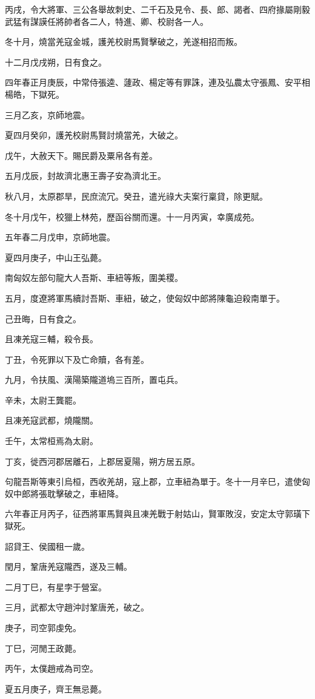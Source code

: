 \begin{pinyinscope}
丙戌，令大將軍、三公各舉故刺史、二千石及見令、長、郎、謁者、四府掾屬剛毅武猛有謀謨任將帥者各二人，特進、卿、校尉各一人。

冬十月，燒當羌寇金城，護羌校尉馬賢擊破之，羌遂相招而叛。

十二月戊戌朔，日有食之。

四年春正月庚辰，中常侍張逵、蘧政、楊定等有罪誅，連及弘農太守張鳳、安平相楊皓，下獄死。

三月乙亥，京師地震。

夏四月癸卯，護羌校尉馬賢討燒當羌，大破之。

戊午，大赦天下。賜民爵及粟帛各有差。

五月戊辰，封故濟北惠王壽子安為濟北王。

秋八月，太原郡旱，民庶流冗。癸丑，遣光祿大夫案行稟貸，除更賦。

冬十月戊午，校獵上林苑，歷函谷關而還。十一月丙寅，幸廣成苑。

五年春二月戊申，京師地震。

夏四月庚子，中山王弘薨。

南匈奴左部句龍大人吾斯、車紐等叛，圍美稷。

五月，度遼將軍馬續討吾斯、車紐，破之，使匈奴中郎將陳龜迫殺南單于。

己丑晦，日有食之。

且凍羌寇三輔，殺令長。

丁丑，令死罪以下及亡命贖，各有差。

九月，令扶風、漢陽築隴道塢三百所，置屯兵。

辛未，太尉王龔罷。

且凍羌寇武都，燒隴關。

壬午，太常桓焉為太尉。

丁亥，徙西河郡居離石，上郡居夏陽，朔方居五原。

句龍吾斯等東引烏桓，西收羌胡，寇上郡，立車紐為單于。冬十一月辛巳，遣使匈奴中郎將張耽擊破之，車紐降。

六年春正月丙子，征西將軍馬賢與且凍羌戰于射姑山，賢軍敗沒，安定太守郭璜下獄死。

詔貸王、侯國租一歲。

閏月，鞏唐羌寇隴西，遂及三輔。

二月丁巳，有星孛于營室。

三月，武都太守趙沖討鞏唐羌，破之。

庚子，司空郭虔免。

丁巳，河閒王政薨。

丙午，太僕趙戒為司空。

夏五月庚子，齊王無忌薨。


\end{pinyinscope}
